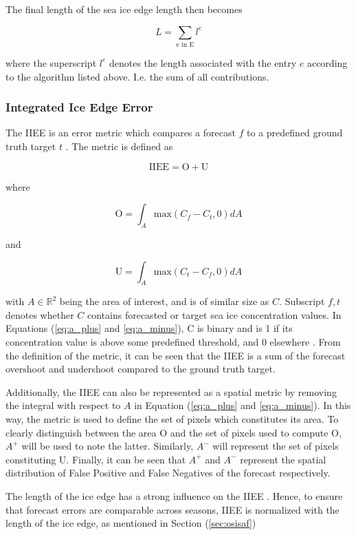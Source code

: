 \documentclass[../main/thesis.tex]{subfiles}
\begin{document}
The final length of the sea ice edge length then becomes

\begin{equation}
    L = \sum_\text{e in E} l^e
\end{equation}

where the superscript $l^e$ denotes the length associated with the entry $e$ according to the algorithm listed above. I.e. the sum of all contributions.

\subsubsection{Integrated Ice Edge Error}
The IIEE is an error metric which compares a forecast $f$ to a predefined ground truth target $t$ \cite{Goessling2016}. The metric is defined as

\begin{equation}
    \label{eq:IIEE}
    \text{IIEE} = \text{O} + \text{U}
\end{equation}

where 

\begin{equation}
    \label{eq:a_plus}
    \text{O} = \int_A\text{max}(C_f - C_t, 0)dA
\end{equation}

and

\begin{equation}
    \label{eq:a_minus}
    \text{U} = \int_A\text{max}(C_t - C_f, 0)dA
\end{equation}

with $A \in{\mathbb{R}^2}$ being the area of interest, and is of similar size as $C$. Subscript $f,t$ denotes whether $C$ contains forecasted or target sea ice concentration values. In Equations (\ref{eq:a_plus} and \ref{eq:a_minus}), C is binary and is 1 if its concentration value is above some predefined threshold, and 0 elsewhere \citep{Goessling2016}. From the definition of the metric, it can be seen that the IIEE is a sum of the forecast overshoot and undershoot compared to the ground truth target. 

Additionally, the IIEE can also be represented as a spatial metric by removing the integral with respect to $A$ in Equation (\ref{eq:a_plus} and \ref{eq:a_minus}). In this way, the metric is used to define the set of pixels which constitutes its area. To clearly distinguish between the area O and the set of pixels used to compute O, $A^+$ will be used to note the latter. Similarly, $A^-$ will represent the set of pixels constituting U. Finally, it can be seen that $A^+$ and $A^-$ represent the spatial distribution of False Positive and False Negatives of the forecast respectively.

The length of the ice edge has a strong influence on the IIEE \citep{Goessling2018,Palerme2019}. Hence, to ensure that forecast errors are comparable across seasons, IIEE is normalized with the length of the ice edge, as mentioned in Section (\ref{sec:osisaf})

\biblio
\end{document}
